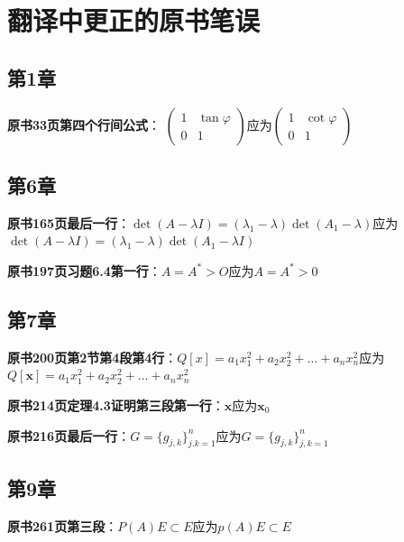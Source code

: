 \chapter*{翻译中更正的原书笔误}

\section*{第1章}

{\bf 原书33页第四个行间公式}： $\begin{pmatrix}1&\tan\varphi\\0&1\end{pmatrix} $应为$\begin{pmatrix}1&\cot\varphi\\0&1\end{pmatrix} $

\section*{第6章}

{\bf 原书165页最后一行}：$\det(A-\lambda I)=(\lambda_1-\lambda)\det(A_1-\lambda)$应为$\det(A-\lambda I)=(\lambda_1-\lambda)\det(A_1-\lambda I)$

{\bf 原书197页习题6.4第一行}：$A=A^*>O$应为$A=A^*>0$

\section*{第7章}

{\bf 原书200页第2节第4段第4行}：$Q[{x}]=a_{1}x_{1}^{2}+a_{2}x_{2}^{2}+\ldots+a_{n}x_{n}^{2}$应为$Q[\mathbf{x}]=a_{1}x_{1}^{2}+a_{2}x_{2}^{2}+\ldots+a_{n}x_{n}^{2}$

{\bf 原书214页定理4.3证明第三段第一行}：$\mathbf{x}$应为$\mathbf{x}_0$

{\bf 原书216页最后一行}：$G=\{g_{j,k}\}_{j.k=1}^n$应为$G=\{g_{j,k}\}_{j,k=1}^n$

\section*{第9章}

{\bf 原书261页第三段}：$P(A)E\subset E$应为$p(A)E\subset E$
